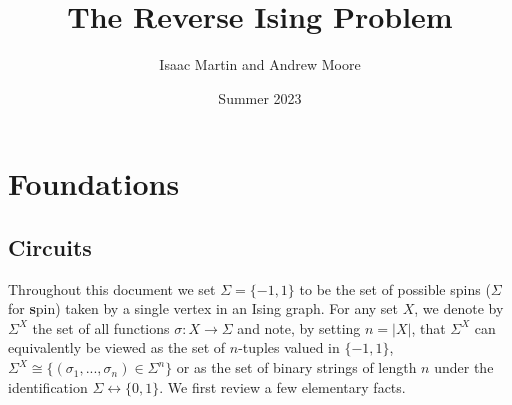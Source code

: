 \documentclass{article}
\begin{document}
\newpage
\title{The Reverse Ising Problem}
\author{Isaac Martin and Andrew Moore}
\date{Summer 2023}
\maketitle
\tableofcontents
\section{Foundations}

\subsection{Circuits}
Throughout this document we set $\Sigma = \{-1,1\}$ to be the set of possible spins ($\Sigma$ for \textbf{s}pin) taken by a single vertex in an Ising graph. For any set $X$, we denote by $\Sigma^X$ the set of all functions $\sigma: X\to \Sigma$ and note, by setting $n = |X|$, that $\Sigma^X$ can equivalently be viewed as the set of $n$-tuples valued in $\{-1, 1\}$, $\Sigma^X \cong \{(\sigma_1, ..., \sigma_n) \in \Sigma^n \}$ or as the set of binary strings of length $n$ under the identification $\Sigma \leftrightarrow \{0,1\}$. We first review a few elementary facts.
\end{document}
